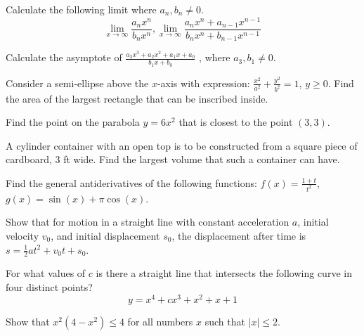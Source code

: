 \documentclass[Calculus 1 Recitation.tex]{subfiles}
\begin{document}
\begin{myleftlinebox}
	Calculate the following limit where $a_n,b_n\neq 0$.
	\[\lim_{x\to\infty}\frac{a_n x^n}{b_n x^n}, \lim_{x\to\infty}\frac{a_n x^n+a_{n-1} x^{n-1}}{b_n x^n+b_{n-1} x^{n-1}}\]
	\tcblower
	\vspace{2em}
\end{myleftlinebox}

\begin{myleftlinebox}
	Calculate the asymptote of 
	\(\frac{a_3 x^3+a_2 x^2+a_1 x+a_0}{b_1 x+b_0}\)
	, where $a_3,b_1\neq0$.
	\tcblower
	\vspace{2em}
\end{myleftlinebox}

\begin{myleftlinebox}
	Consider a semi-ellipse above the $x$-axis with expression: $\frac{x^2}{a^2}+\frac{y^2}{b^2}=1$, $y\geq 0$. Find the area of the largest rectangle that can be inscribed inside.
	\tcblower
	\vspace{2em}
\end{myleftlinebox}

\begin{myleftlinebox}
	Find the point on the parabola $y=6x^2$ that is closest to the point $(3,3)$.
	\tcblower
	\vspace{2em}
\end{myleftlinebox}

\begin{myleftlinebox}
	A cylinder container with an open top is to be constructed from a square piece of cardboard, 3 ft wide. Find the largest volume that such a container can have.
	\tcblower
	\vspace{2em}
\end{myleftlinebox}

\begin{myleftlinebox}
	Find the general antiderivatives of the following functions: $f(x)=\frac{1+t}{t^2}$, $g(x)=\sin(x)+\pi\cos(x)$.
	\tcblower
	\vspace{2em}
\end{myleftlinebox}

\begin{myleftlinebox}
	Show that for motion in a straight line with constant acceleration $a$, initial velocity $v_0$, and initial displacement $s_0$, the displacement after time is $s=\frac{1}{2}at^2+v_0t+s_0$.
	\tcblower
	\vspace{2em}
\end{myleftlinebox}

\begin{myleftlinebox}
	For what values of $c$ is there a straight line that intersects the following curve in four distinct points?
	\[y=x^4+cx^3+x^2+x+1\]
	\tcblower
	\vspace{2em}
\end{myleftlinebox}

\begin{myleftlinebox}
	Show that $x^2(4-x^2)\leq 4$ for all numbers $x$ such that $|x|\leq 2$.
	\tcblower
	\vspace{2em}
\end{myleftlinebox}
\end{document}
